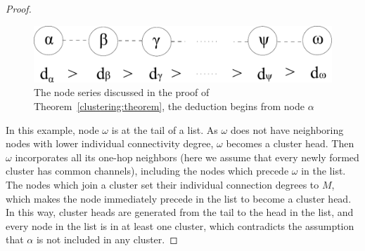 \documentclass[times]{ettauth}
\theoremstyle{mytheoremstyle}
\theoremstyle{mytheoremstyle}
\theoremstyle{mytheoremstyle}
\begin{document}
\begin{proof}
\begin{figure}[ht!]
  \centering
\includegraphics[width=0.6\linewidth]{lemma1.pdf}
	\caption{The node series discussed in the proof of Theorem~\ref{clustering:theorem}, the deduction begins from node $\alpha$}
	\label{lemma1}
\end{figure}


In this example, node $\omega$ is at the tail of a list.
As $\omega$ does not have neighboring nodes with lower individual connectivity degree, $\omega$ becomes a cluster head.
Then $\omega$ incorporates all its one-hop neighbors (here we assume that every newly formed cluster has common channels), including the nodes which precede $\omega$ in the list.
The nodes which join a cluster set their individual connection degrees to $M$, which makes the node immediately precede in the list to become a cluster head.
In this way, cluster heads are generated from the tail to the head in the list, and every node in the list is in at least one cluster, which contradicts the assumption that $\alpha$ is not included in any cluster.


\end{proof}


%
\end{document}
